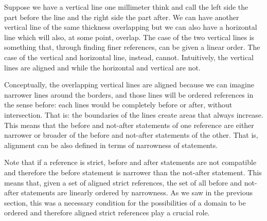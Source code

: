 \documentclass[11pt,letterpaper,fleqn]{memoir} %
\begin{document}
Suppose we have a vertical line one millimeter think and call the left side the part before the line and the right side the part after. We can have another vertical line of the same thickness overlapping but we can also have a horizontal line which will also, at some point, overlap. The case of the two vertical lines is something that, through finding finer references, can be given a linear order. The case of the vertical and horizontal line, instead, cannot. Intuitively, the vertical lines are aligned and while the horizontal and vertical are not.

Conceptually, the overlapping vertical lines are aligned because we can imagine narrower lines around the borders, and those lines will be ordered references in the sense before: each lines would be completely before or after, without intersection. That is: the boundaries of the lines create areas that always increase. This means that the before and not-after statements of one reference are either narrower or broader of the before and not-after statements of the other. That is, alignment can be also defined in terms of narrowness of statements.

Note that if a reference is strict, before and after statements are not compatible and therefore the before statement is narrower than the not-after statement. This means that, given a set of aligned strict references, the set of all before and not-after statements are linearly ordered by narrowness. As we saw in the previous section, this was a necessary condition for the possibilities of a domain to be ordered and therefore aligned strict references play a crucial role.
\end{document}
